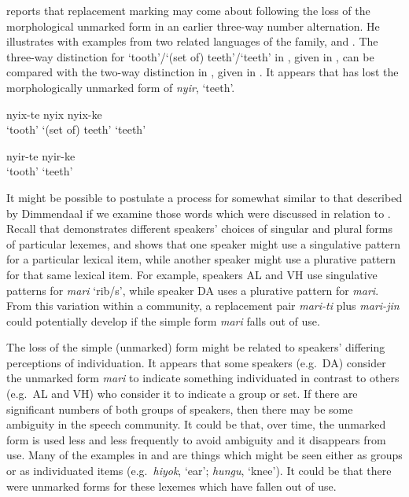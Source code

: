 \documentclass[output=paper]{langsci/langscibook}
\begin{document}
\citet[242]{Dimmendaal2000} reports that replacement marking may come about following the loss of the morphological unmarked form in an earlier three-way number alternation. He illustrates with examples from two related  languages of the  family,  and . The three-way distinction for ‘tooth’/‘(set of) teeth’/‘teeth’ in , given in , can be compared with the two-way distinction in , given in . It appears that  has lost the morphologically unmarked form of \textit{nyir}, ‘teeth’.

\ea\label{ex:moodie:4}
 \citep[242]{Dimmendaal2000}

\gll nyix-te nyix nyix-ke \\
‘tooth’ {‘(set of) teeth’} ‘teeth’ \\
\z

\ea\label{ex:moodie:5}
 \citep[243]{Dimmendaal2000}

\gll nyir-te nyir-ke \\
‘tooth’ ‘teeth’ \\
\z 

It might be possible to postulate a process for  somewhat similar to that described by Dimmendaal if we examine those words which were discussed in relation to . Recall that  demonstrates different speakers’ choices of singular and plural forms of particular lexemes, and shows that one speaker might use a singulative pattern for a particular lexical item, while another speaker might use a plurative pattern for that same lexical item. For example, speakers AL and VH use singulative patterns for \textit{mari} ‘rib/s’, while speaker DA uses a plurative pattern for \textit{mari}. From this variation within a community, a replacement pair \textit{mari-ti} plus \textit{mari-jin} could potentially develop if the simple form \textit{mari} falls out of use. 

The loss of the simple (unmarked) form might be related to speakers’ differing perceptions of individuation. It appears that some speakers (e.g.\ DA) consider the unmarked form \textit{mari }to indicate something individuated in contrast to others (e.g.\ AL and VH) who consider it to indicate a group or set. If there are significant numbers of both groups of speakers, then there may be some ambiguity in the speech community. It could be that, over time, the unmarked form is used less and less frequently to avoid ambiguity and it disappears from use. Many of the examples in  and  are things which might be seen either as groups or as individuated items (e.g.\ \textit{hiyok}, ‘ear’; \textit{hungu}, ‘knee’). It could be that there were unmarked forms for these lexemes which have fallen out of use.
\end{document}
